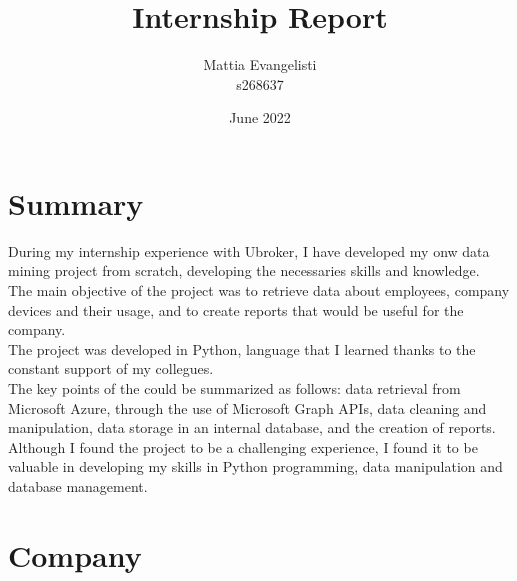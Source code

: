 \documentclass[12pt, a4paper, twoside]{article}
\title{\huge Internship Report}
\author{Mattia Evangelisti \\ s268637}
\date{June 2022}
\begin{document}
\begin{titlepage}
    \maketitle
\end{titlepage}

\tableofcontents
\clearpage\null\newpage

\newpage
\section{Summary}
During my internship experience with Ubroker, I have developed my onw data mining project from scratch, developing the necessaries skills and knowledge.\\
The main objective of the project was to retrieve data about employees, company devices and their usage, and to create reports that would be useful for the company.\\
The project was developed in Python, language that I learned thanks to the constant support of my collegues.\\
The key points of the could be summarized as follows: data retrieval from Microsoft Azure, through the use of Microsoft Graph APIs, data cleaning and manipulation, data storage in an internal database,
and the creation of reports.\\
Although I found the project to be a challenging experience, I found it to be valuable in developing my skills in Python programming, data manipulation and database management.\\

\newpage
\section{Company}
\end{document}
